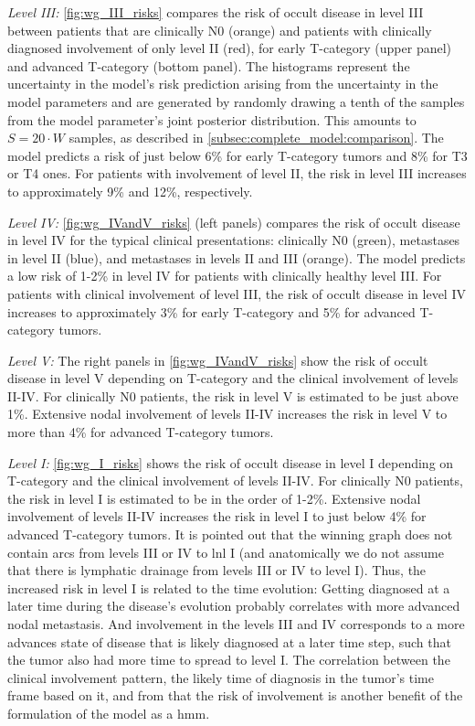 \documentclass[twocolumn]{aastex631}
\begin{document}
{\it Level III:} \autoref{fig:wg_III_risks} compares the risk of occult disease in level III between patients that are clinically N0 (orange) and patients with clinically diagnosed involvement of only level II (red), for early T-category (upper panel) and advanced T-category (bottom panel). The histograms represent the uncertainty in the model's risk prediction arising from the uncertainty in the model parameters and are generated by randomly drawing a tenth of the samples from the model parameter's joint posterior distribution. This amounts to $S = 20 \cdot W$ samples, as described in \autoref{subsec:complete_model:comparison}. The model predicts a risk of just below 6\% for early T-category tumors and 8\% for T3 or T4 ones. For patients with involvement of level II, the risk in level III increases to approximately 9\% and 12\%, respectively.

{\it Level IV:} \autoref{fig:wg_IVandV_risks} (left panels) compares the risk of occult disease in level IV for the typical clinical presentations: clinically N0 (green), metastases in level II (blue), and metastases in levels II and III (orange). The model predicts a low risk of 1-2\% in level IV for patients with clinically healthy level III. For patients with clinical involvement of level III, the risk of occult disease in level IV increases to approximately 3\% for early T-category and 5\% for advanced T-category tumors.

{\it Level V:} The right panels in \autoref{fig:wg_IVandV_risks} show the risk of occult disease in level V depending on T-category and the clinical involvement of levels II-IV. For clinically N0 patients, the risk in level V is estimated to be just above 1\%. Extensive nodal involvement of levels II-IV increases the risk in level V to more than 4\% for advanced T-category tumors. 

{\it Level I:} \autoref{fig:wg_I_risks} shows the risk of occult disease in level I depending on T-category and the clinical involvement of levels II-IV. For clinically N0 patients, the risk in level I is estimated to be in the order of 1-2\%. Extensive nodal involvement of levels II-IV increases the risk in level I to just below 4\% for advanced T-category tumors. It is pointed out that the winning graph does not contain arcs from levels III or IV to \gls{lnl} I (and anatomically we do not assume that there is lymphatic drainage from levels III or IV to level I). Thus, the increased risk in level I is related to the time evolution: Getting diagnosed at a later time during the disease's evolution probably correlates with more advanced nodal metastasis. And involvement in the levels III and IV corresponds to a more advances state of disease that is likely diagnosed at a later time step, such that the tumor also had more time to spread to level I. The correlation between the clinical involvement pattern, the likely time of diagnosis in the tumor's time frame based on it, and from that the risk of involvement is another benefit of the formulation of the model as a \gls{hmm}.
\end{document}
